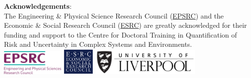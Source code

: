 \documentclass[11pt]{article}%
\begin{document}
{\large \bf Acknowledgements}:\\
The Engineering \& Physical Science Research Council (\href{https://www.epsrc.ac.uk}{EPSRC}) and the Economic \& Social Research Council (\href{www.esrc.ac.uk}{ESRC}) are greatly acknowledged for their funding and support to the Centre for Doctoral Training in Quantification of Risk and Uncertainty in Complex Systems and Environments.\\
\href{https://www.epsrc.ac.uk}{\includegraphics[width=0.23\textwidth]{logos/EPSRC.png}}
\href{www.esrc.ac.uk}{\includegraphics[width=0.12\textwidth]{logos/Esrc_logo.png}}
\hspace{10pt}
\href{https://www.liverpool.ac.uk/}{\includegraphics[width=0.4\textwidth]{logos/university.png}}\\
\BackToContents
\end{document}
